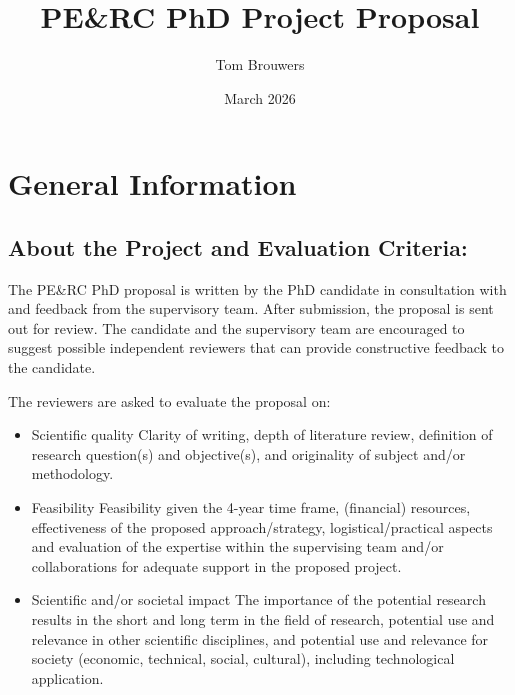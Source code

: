 \documentclass{article}
\title{PE\&RC PhD Project Proposal}
\author{Tom Brouwers}
\date{March 2026}
\begin{document}
\maketitle

\section{General Information}
\subsection{About the Project and Evaluation Criteria:}
The PE\&RC PhD proposal is written by the PhD candidate in consultation with and feedback from the supervisory team. After submission, the proposal is sent out for review. The candidate and the supervisory team are encouraged to suggest possible independent reviewers that can provide constructive feedback to the candidate. 

The reviewers are asked to evaluate the proposal on:
\begin{itemize}
\item Scientific quality
Clarity of writing, depth of literature review, definition of research question(s) and objective(s), and originality of subject and/or methodology.
\item Feasibility
Feasibility given the 4-year time frame, (financial) resources, effectiveness of the proposed approach/strategy, logistical/practical aspects and evaluation of the expertise within the supervising team and/or collaborations for adequate support in the proposed project.
\item Scientific and/or societal impact
The importance of the potential research results in the short and long term in the field of research, potential use and relevance in other scientific disciplines, and potential use and relevance for society (economic, technical, social, cultural), including technological application. 
\end{itemize}
\end{document}
